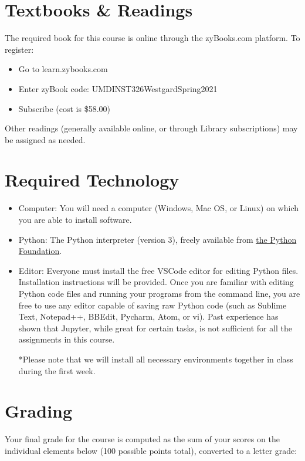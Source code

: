 \documentclass[11pt]{article}
\begin{document}
\section{Textbooks \& Readings}
The required book for this course is online through the zyBooks.com platform. To register: 
\begin{itemize}
	\item Go to learn.zybooks.com
	\item Enter zyBook code: UMDINST326WestgardSpring2021
	\item Subscribe (cost is \$58.00)
\end{itemize}

Other readings (generally available online, or through Library subscriptions) may be assigned as needed.

\section{Required Technology}
\begin{itemize}
	\item Computer: You will need a computer (Windows, Mac OS, or Linux) on which you are able to install software.
	\item Python: The Python interpreter (version 3), freely available from \href{https://www.python.org/downloads}{the Python Foundation}.
	\item Editor: Everyone must install the free VSCode editor for editing Python files. Installation instructions will be provided. Once you are familiar with editing Python code files and running your programs from the command line, you are free to use any editor capable of saving raw Python code (such as Sublime Text, Notepad++, BBEdit, Pycharm, Atom, or vi). Past experience has shown that Jupyter, while great for certain tasks, is not sufficient for all the assignments in this course.

*Please note that we will install all necessary environments together in class during the first week.
\end{itemize}

\section{Grading}
Your final grade for the course is computed as the sum of your scores on the individual elements below (100 possible points total), converted to a letter grade:
\end{document}
